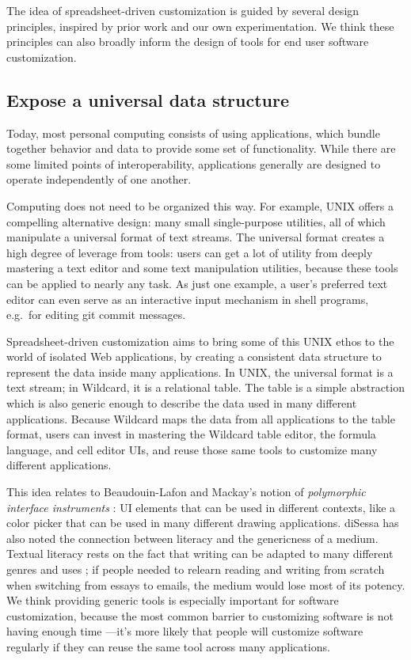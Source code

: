 \documentclass[english,submission]{programming}
\begin{document}
The idea of spreadsheet-driven customization is guided by several design
principles, inspired by prior work and our own experimentation. We think
these principles can also broadly inform the design of tools for end
user software customization.

\hypertarget{expose-a-universal-data-structure}{%
\subsection{Expose a universal data
structure}\label{expose-a-universal-data-structure}}

Today, most personal computing consists of using applications, which
bundle together behavior and data to provide some set of functionality.
While there are some limited points of interoperability, applications
generally are designed to operate independently of one another.

Computing does not need to be organized this way. For example, UNIX
offers a compelling alternative design: many small single-purpose
utilities, all of which manipulate a universal format of text streams.
The universal format creates a high degree of leverage from tools: users
can get a lot of utility from deeply mastering a text editor and some
text manipulation utilities, because these tools can be applied to
nearly any task. As just one example, a user's preferred text editor can
even serve as an interactive input mechanism in shell programs, e.g.~for
editing git commit messages.

Spreadsheet-driven customization aims to bring some of this UNIX ethos
to the world of isolated Web applications, by creating a consistent data
structure to represent the data inside many applications. In UNIX, the
universal format is a text stream; in Wildcard, it is a relational
table. The table is a simple abstraction which is also generic enough to
describe the data used in many different applications. Because Wildcard
maps the data from all applications to the table format, users can
invest in mastering the Wildcard table editor, the formula language, and
cell editor UIs, and reuse those same tools to customize many different
applications.

This idea relates to Beaudouin-Lafon and Mackay's notion of
\emph{polymorphic interface instruments} \autocite{beaudouin-lafon2000}:
UI elements that can be used in different contexts, like a color picker
that can be used in many different drawing applications. diSessa has
also noted the connection between literacy and the genericness of a
medium. Textual literacy rests on the fact that writing can be adapted
to many different genres and uses \autocite{disessa2000}; if people
needed to relearn reading and writing from scratch when switching from
essays to emails, the medium would lose most of its potency. We think
providing generic tools is especially important for software
customization, because the most common barrier to customizing software
is not having enough time \autocite{mackay1991}---it's more likely that
people will customize software regularly if they can reuse the same tool
across many applications.
\end{document}
